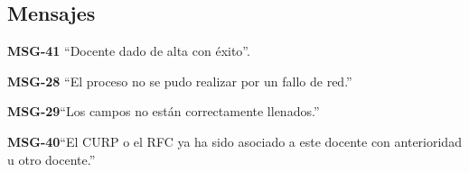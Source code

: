 \subsection{Mensajes}

\begin{Citemize}
    \item {\bf MSG-41} ``Docente dado de alta con éxito''.
    \item {\bf MSG-28}  ``El proceso no se pudo realizar por un fallo de red.''
    \item {\bf MSG-29}{``Los campos no están correctamente llenados.''}
    \item {\bf MSG-40}{``El CURP o el RFC ya ha sido asociado a este docente con anterioridad u otro docente.''}
\end{Citemize}

